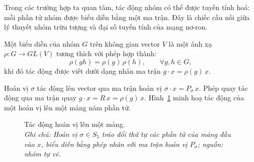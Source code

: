 Trong các trường hợp ta quan tâm, tác động nhóm có thể được tuyến tính
hoá: mỗi phần tử nhóm được biểu diễn bằng một ma trận. Đây là chiếc cầu nối
giữa lý thuyết nhóm trừu tượng và đại số tuyến tính của mạng nơ-ron.
 
\begin{definition}
\label{def:bieu-dien}
Một biểu diễn của nhóm $G$ trên không gian vector $V$ là một ánh xạ
$\rho:G\to GL(V)$ tương thích với phép hợp thành:
\begin{equation}
\label{eq:rep-hom}
\rho(gh) = \rho(g)\,\rho(h), \qquad \forall g,h\in G,
\end{equation}
khi đó tác động được viết dưới dạng nhân ma trận $g\cdot x = \rho(g)\,x$.
\end{definition}
 
\begin{example}
\label{vd:rep}
Hoán vị $\sigma$ tác động lên vector qua ma trận hoán vị
$\sigma\cdot x = P_{\sigma}\,x$. Phép quay tác động qua ma trận quay
$g\cdot x = R\,x = \rho(g)\,x$. Hình~\ref{fig:permutation} minh hoạ tác động của
một hoán vị lên một mảng năm phần tử.
\end{example}
 
\begin{figure}[t]
\centering
{}
\caption[Tác động hoán vị lên một mảng]{Tác động hoán vị lên một mảng.\protect\\[2pt]
\textit{Ghi chú: Hoán vị $\sigma\in S_{5}$ tráo đổi thứ tự các phần tử của mảng đầu vào $x$, biểu diễn bằng phép nhân với ma trận hoán vị $P_{\sigma}$; nguồn: nhóm tự vẽ.}}
\label{fig:permutation}
\end{figure}
 
